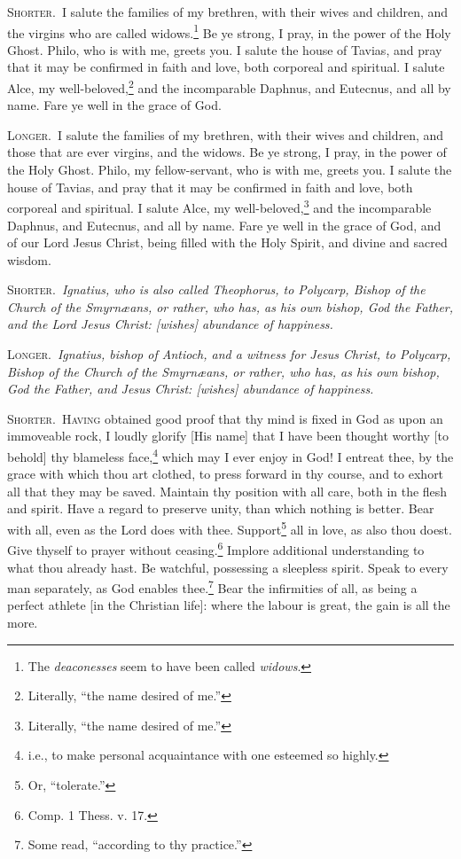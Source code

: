 
\textsc{Shorter.}~I salute the families of my brethren, with their wives and children, and the virgins who are called widows.\footnote{The \emph{deaconesses} seem to have been called \emph{widows}.} Be ye strong, I pray, in the power of the Holy Ghost. Philo, who is with me, greets you. I salute the house of Tavias, and pray that it may be confirmed in faith and love, both corporeal and spiritual. I salute Alce, my well-beloved,\footnote{Literally, “the name desired of me.”} and the incomparable Daphnus, and Eutecnus, and all by name. Fare ye well in the grace of God.

\textsc{Longer.}~I salute the families of my brethren, with their wives and children, and those that are ever virgins, and the widows. Be ye strong, I pray, in the power of the Holy Ghost. Philo, my fellow-servant, who is with me, greets you. I salute the house of Tavias, and pray that it may be confirmed in faith and love, both corporeal and spiritual. I salute Alce, my well-beloved,\footnote{Literally, “the name desired of me.”} and the incomparable Daphnus, and Eutecnus, and all by name. Fare ye well in the grace of God, and of our Lord Jesus Christ, being filled with the Holy Spirit, and divine and sacred wisdom.


\textsc{Shorter.}~\emph{Ignatius, who is also called Theophorus, to Polycarp, Bishop of the Church of the Smyrnæans, or rather, who has, as his own bishop, God the Father, and the Lord Jesus Christ: [wishes] abundance of happiness.}

\textsc{Longer.}~\emph{Ignatius, bishop of Antioch, and a witness for Jesus Christ, to Polycarp, Bishop of the Church of the Smyrnæans, or rather, who has, as his own bishop, God the Father, and Jesus Christ: [wishes] abundance of happiness.}


\textsc{Shorter.}~\textsc{Having} obtained good proof that thy mind is fixed in God as upon an immoveable rock, I loudly glorify [His name] that I have been thought worthy [to behold] thy blameless face,\footnote{i.e., to make personal acquaintance with one esteemed so highly.} which may I ever enjoy in God! I entreat thee, by the grace with which thou art clothed, to press forward in thy course, and to exhort all that they may be saved. Maintain thy position with all care, both in the flesh and spirit. Have a regard to preserve unity, than which nothing is better. Bear with all, even as the Lord does with thee. Support\footnote{Or, “tolerate.”} all in love, as also thou doest. Give thyself to prayer without ceasing.\footnote{Comp. 1 Thess. v. 17.} Implore additional understanding to what thou already hast. Be watchful, possessing a sleepless spirit. Speak to every man separately, as God enables thee.\footnote{Some read, “according to thy practice.”} Bear the infirmities of all, as being a perfect athlete [in the Christian life]: where the labour is great, the gain is all the more.

